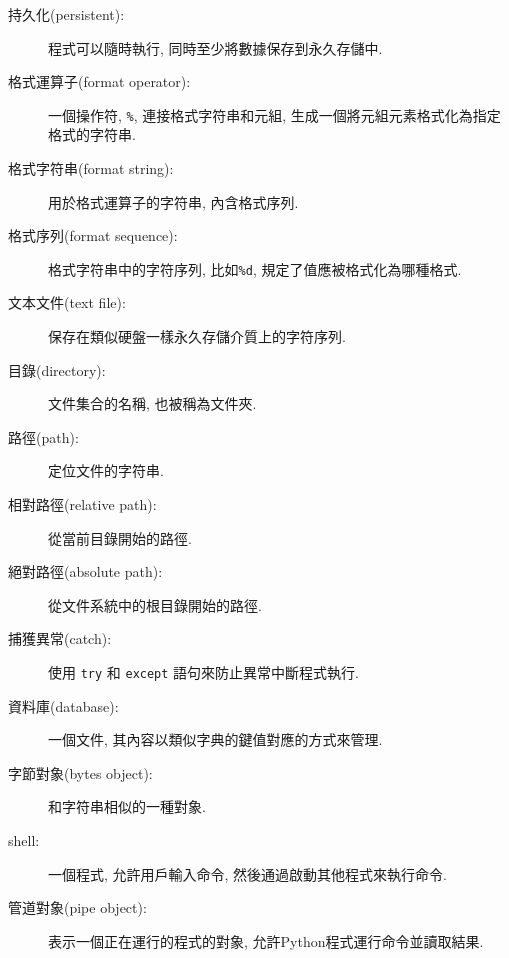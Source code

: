 \documentclass[10pt]{book}
\begin{document}
\begin{description}

\item[持久化(persistent):] 程式可以隨時執行, 同時至少將數據保存到永久存儲中. 

\item[格式運算子(format operator):] 一個操作符, {\tt \%}, 連接格式字符串和元組, 
生成一個將元組元素格式化為指定格式的字符串. 

\item[格式字符串(format string):] 用於格式運算子的字符串, 內含格式序列.  

\item[格式序列(format sequence):] 格式字符串中的字符序列, 
比如{\tt \%d}, 規定了值應被格式化為哪種格式.

\item[文本文件(text file):] 保存在類似硬盤一樣永久存儲介質上的字符序列. 

\item[目錄(directory):] 文件集合的名稱, 也被稱為文件夾.

\item[路徑(path):] 定位文件的字符串. 

\item[相對路徑(relative path):] 從當前目錄開始的路徑. 

\item[絕對路徑(absolute path):] 從文件系統中的根目錄開始的路徑. 

\item[捕獲異常(catch):] 使用 {\tt try} 和 {\tt except} 語句來防止異常中斷程式執行. 

\item[資料庫(database):] 一個文件, 其內容以類似字典的鍵值對應的方式來管理. 

\item[字節對象(bytes object):] 和字符串相似的一種對象.

\item[shell:] 一個程式, 允許用戶輸入命令, 然後通過啟動其他程式來執行命令. 

\item[管道對象(pipe object):] 表示一個正在運行的程式的對象, 
允許Python程式運行命令並讀取結果.

\end{description}
\end{document}
